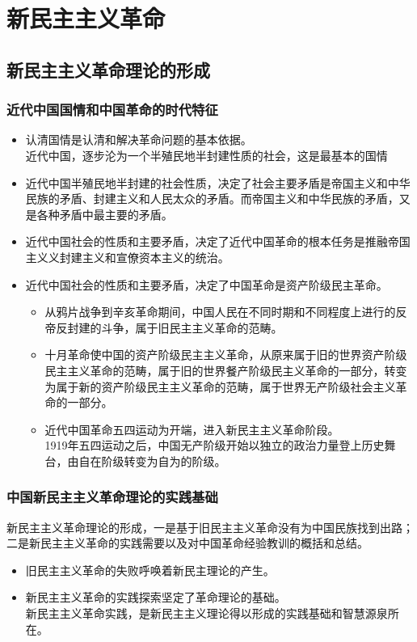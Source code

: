 \chapter{新民主主义革命}
\section{新民主主义革命理论的形成}
\subsection{近代中国国情和中国革命的时代特征}
\begin{itemize}
	\item 认清国情是认清和解决革命问题的基本依据。\\
	近代中国，逐步沦为一个半殖民地半封建性质的社会，这是最基本的国情
	\item 近代中国半殖民地半封建的社会性质，决定了社会主要矛盾是帝国主义和中华民族的矛盾、封建主义和人民太众的矛盾。而帝国主义和中华民族的矛盾，又是各种矛盾中最主要的矛盾。
	\item 近代中国社会的性质和主要矛盾，决定了近代中国革命的根本任务是推融帝国主义义封建主义和宣僚资本主义的统治。
	\item 近代中国社会的性质和主要矛盾，决定了中国革命是资产阶级民主革命。
	\begin{itemize}
		\item 	从鸦片战争到辛亥革命期间，中国人民在不同时期和不同程度上进行的反帝反封建的斗争，属于旧民主主义革命的范畴。
		\item 十月革命使中国的资产阶级民主主义革命，从原来属于旧的世界资产阶级民主主义革命的范畴，属于旧的世界餐产阶级民主义革命的一部分，转变为属于新的资产阶级民主主义革命的范畴，属于世界无产阶级社会主义革命的一部分。
		\item 近代中国革命五四运动为开端，进入新民主主义革命阶段。\\
		1919年五四运动之后，中国无产阶级开始以独立的政治力量登上历史舞台，由自在阶级转变为自为的阶级。
	\end{itemize}
\end{itemize}
\subsection{中国新民主主义革命理论的实践基础}
新民主主义革命理论的形成，一是基于旧民主主义革命没有为中国民族找到出路；二是新民主主义革命的实践需要以及对中国革命经验教训的概括和总结。
\begin{itemize}
	\item 旧民主主义革命的失败呼唤着新民主理论的产生。
	\item 新民主主义革命的实践探索坚定了革命理论的基础。\\
	新民主主义革命实践，是新民主主义理论得以形成的实践基础和智慧源泉所在。
\end{itemize}